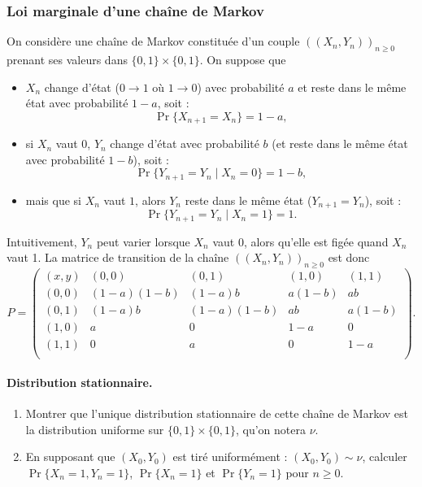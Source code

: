 \subsubsection{Loi marginale d'une chaîne de Markov }

On considère une chaîne de Markov constituée d'un couple $((X_n, Y_n))_{n \geq 0}$ prenant ses valeurs dans $\{0, 1\} \times \{0, 1 \}$. On suppose que 
\begin{itemize}
 \item $X_n$ change d'état ($0 \to 1$ où $1 \to 0$) avec probabilité $a$ et reste dans le même état avec probabilité $1-a$, soit :
 $$
 \Pr\{X_{n+1} = X_n\} = 1-a, 
 $$ 
 \item si $X_n$ vaut $0$, $Y_n$ change d'état avec probabilité $b$ (et reste dans le même état avec probabilité $1 - b$), soit :
 $$
 \Pr\{Y_{n+1} = Y_n \mid X_n = 0\} = 1-b, 
 $$ 
 \item mais que si $X_n$ vaut $1$, alors $Y_n$ reste dans le même état ($Y_{n+1} = Y_n$), soit :
 $$
 \Pr\{Y_{n+1} = Y_n \mid X_n = 1\} = 1.
 $$
\end{itemize}
Intuitivement, $Y_n$ peut varier lorsque $X_n$ vaut 0, alors qu'elle est figée quand $X_n$ vaut 1.
La matrice de transition de la chaîne $((X_n, Y_n))_{n \geq 0}$ est donc
$$
P = 
\left(
\begin{array}{c|cccc}
  (x, y) & (0, 0) & (0, 1) & (1, 0) & (1, 1) \\
  \hline
  (0, 0) & (1-a)(1-b) & (1-a)b & a(1-b) & ab \\
  (0, 1) & (1-a)b & (1-a)(1-b) & ab & a(1-b) \\
  (1, 0) & a & 0 & 1-a & 0 \\
  (1, 1) & 0 & a & 0 & 1-a \\
\end{array}
\right).
$$

\bigskip
\paragraph{Distribution stationnaire.}
\begin{enumerate}
  \item Montrer que l'unique distribution stationnaire de cette chaîne de Markov est la distribution uniforme sur $\{0, 1\} \times \{0, 1 \}$, qu'on notera $\nu$.
  \item En supposant que $(X_0, Y_0)$ est tiré uniformément : $(X_0, Y_0) \sim \nu$, calculer $\Pr\{X_n = 1, Y_n = 1\}$, $\Pr\{X_n = 1\}$ et $\Pr\{Y_n = 1\}$ pour $n \geq 0$.
\end{enumerate}

